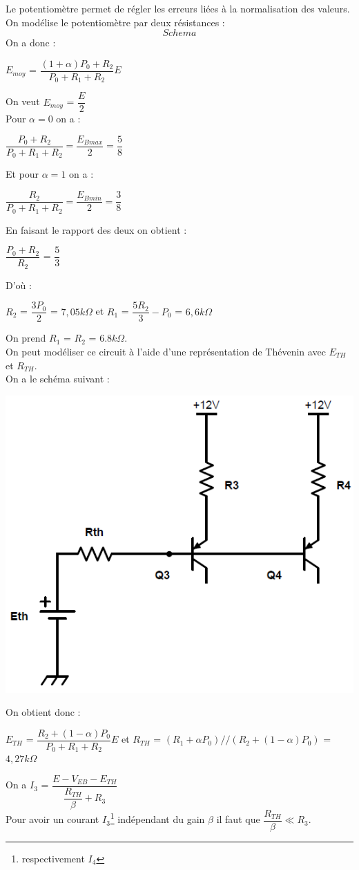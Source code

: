 \documentclass[a4paper]{report}
\begin{document}
Le potentiomètre permet de régler les erreurs liées à la normalisation des valeurs.\\
On modélise le potentiomètre par deux résistances : \\
$$Schema$$
On a donc : \\
\begin{center}
$E_{moy}$ = $ \dfrac{(1+\alpha)P_0 + R_2}{P_0 + R_1 + R_2} E$\\
\end{center}
On veut $E_{moy}$ = $\dfrac{E}{2}$\\
Pour $\alpha = 0$ on a : \\
\begin{center}
$\dfrac{P_0 + R_2}{P_0 + R_1 + R_2} = \dfrac{E_{Bmax}}{2} = \dfrac{5}{8}$\\
\end{center}
Et pour $\alpha = 1$ on a : \\
\begin{center}
$\dfrac{R_2}{P_0 + R_1 + R_2}= \dfrac{E_{Bmin}}{2} = \dfrac{3}{8}$\\
\end{center}

En faisant le rapport des deux on obtient : \\
\begin{center}


 $\dfrac{P_0 + R_2}{R_2}$ = $\dfrac{5}{3}$ \\
\end{center}
D'où : \\
\begin{center}
$R_2$ = $\dfrac{3P_0}{2}$ = $7,05k \Omega$ et $R_1$ = $\dfrac{5R_2}{3}-P_0$ = $6,6k \Omega$\\
\end{center} 
On prend $R_1$ = $R_2$ = $6.8k \Omega$.\\
On peut modéliser ce circuit à l'aide d'une représentation de Thévenin avec $E_{TH}$ et $R_{TH}$.\\
On a le schéma suivant :\\
\begin{center}
\includegraphics[width=.41\textwidth]{th.PNG}
\end{center}
On obtient donc : \\
\begin{center}
$E_{TH}$ = $\dfrac{R_2 + (1-\alpha)P_0}{P_0 + R_1 + R_2}E$ et $R_{TH}$ = $(R_1 + \alpha P_0)//(R_2 + (1-\alpha)P_0)$ = $4,27k\Omega$\\
\end{center}
On a $I_3$ = $\dfrac{E-V_{EB}-E_{TH}}{\dfrac{R_{TH}}{\beta}+ R_3}$\\
Pour avoir un courant $I_3$\footnote{respectivement $I_4$} indépendant du gain $\beta$ il faut que $\dfrac{R_{TH}}{\beta} \ll R_3$.
\end{document}
